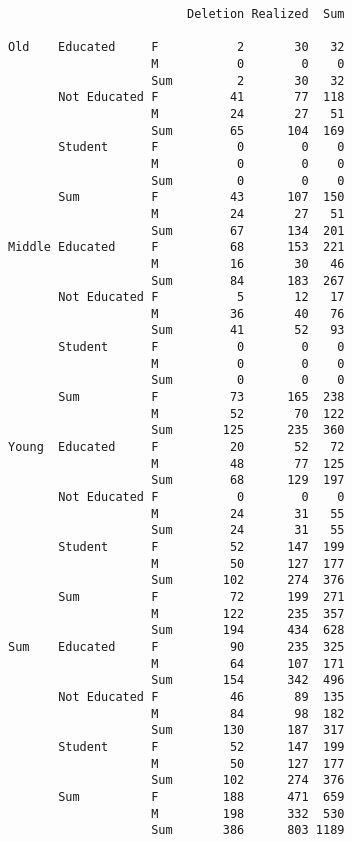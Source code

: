 \documentclass[
  12pt,
  letterpaper]{article}
\newenvironment{Shaded}{\begin{snugshade}}{\end{snugshade}}
\newcommand{\CommentTok}[1]{\textcolor[rgb]{0.37,0.37,0.37}{#1}}
\newcommand{\FunctionTok}[1]{\textcolor[rgb]{0.28,0.35,0.67}{#1}}
\newcommand{\NormalTok}[1]{\textcolor[rgb]{0.00,0.23,0.31}{#1}}
\newcommand{\SpecialCharTok}[1]{\textcolor[rgb]{0.37,0.37,0.37}{#1}}
\begin{document}
\begin{Shaded}
\end{Shaded}

\begin{verbatim}
                         Deletion Realized  Sum
                                               
Old    Educated     F           2       30   32
                    M           0        0    0
                    Sum         2       30   32
       Not Educated F          41       77  118
                    M          24       27   51
                    Sum        65      104  169
       Student      F           0        0    0
                    M           0        0    0
                    Sum         0        0    0
       Sum          F          43      107  150
                    M          24       27   51
                    Sum        67      134  201
Middle Educated     F          68      153  221
                    M          16       30   46
                    Sum        84      183  267
       Not Educated F           5       12   17
                    M          36       40   76
                    Sum        41       52   93
       Student      F           0        0    0
                    M           0        0    0
                    Sum         0        0    0
       Sum          F          73      165  238
                    M          52       70  122
                    Sum       125      235  360
Young  Educated     F          20       52   72
                    M          48       77  125
                    Sum        68      129  197
       Not Educated F           0        0    0
                    M          24       31   55
                    Sum        24       31   55
       Student      F          52      147  199
                    M          50      127  177
                    Sum       102      274  376
       Sum          F          72      199  271
                    M         122      235  357
                    Sum       194      434  628
Sum    Educated     F          90      235  325
                    M          64      107  171
                    Sum       154      342  496
       Not Educated F          46       89  135
                    M          84       98  182
                    Sum       130      187  317
       Student      F          52      147  199
                    M          50      127  177
                    Sum       102      274  376
       Sum          F         188      471  659
                    M         198      332  530
                    Sum       386      803 1189
\end{verbatim}
\end{document}
